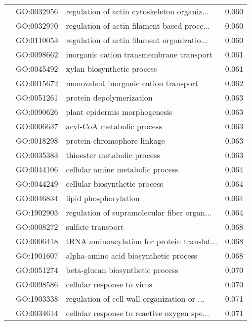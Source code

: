 \begin{longtable}{lllr}
   & GO:0032956 &  regulation of actin cytoskeleton organiz... &         0.060 \\
   & GO:0032970 &  regulation of actin filament-based proce... &         0.060 \\
   & GO:0110053 &  regulation of actin filament organizatio... &         0.060 \\
   & GO:0098662 &     inorganic cation transmembrane transport &         0.061 \\
   & GO:0045492 &                   xylan biosynthetic process &         0.061 \\
   & GO:0015672 &        monovalent inorganic cation transport &         0.062 \\
   & GO:0051261 &                     protein depolymerization &         0.063 \\
   & GO:0090626 &                plant epidermis morphogenesis &         0.063 \\
   & GO:0006637 &                   acyl-CoA metabolic process &         0.063 \\
   & GO:0018298 &                  protein-chromophore linkage &         0.063 \\
   & GO:0035383 &                  thioester metabolic process &         0.063 \\
   & GO:0044106 &             cellular amine metabolic process &         0.064 \\
   & GO:0044249 &                cellular biosynthetic process &         0.064 \\
   & GO:0046834 &                        lipid phosphorylation &         0.064 \\
   & GO:1902903 &  regulation of supramolecular fiber organ... &         0.064 \\
   & GO:0008272 &                            sulfate transport &         0.068 \\
   & GO:0006418 &  tRNA aminoacylation for protein translat... &         0.068 \\
   & GO:1901607 &        alpha-amino acid biosynthetic process &         0.068 \\
   & GO:0051274 &             beta-glucan biosynthetic process &         0.070 \\
   & GO:0098586 &                   cellular response to virus &         0.070 \\
   & GO:1903338 &  regulation of cell wall organization or ... &         0.071 \\
   & GO:0034614 &  cellular response to reactive oxygen spe... &         0.071 \\

\end{longtable}
